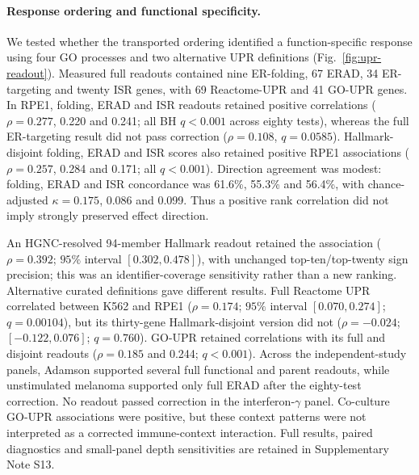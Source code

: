 \documentclass[a4paper,fleqn]{cas-sc}
\makeatletter
\DeclareRobustCommand{\rev}[1]{{\color{red}\def\@citecolor{black}\def\@linkcolor{red}\def\@urlcolor{red}#1}}
\makeatother
\begin{document}
\paragraph{\rev{Response ordering and functional specificity.}}

\rev{We tested whether the transported ordering identified a function-specific response using four GO processes and two alternative UPR definitions (Fig.~\ref{fig:upr-readout}).} \rev{Measured full readouts contained nine ER-folding, 67 ERAD, 34 ER-targeting and twenty ISR genes, with 69 Reactome-UPR and 41 GO-UPR genes.} \rev{In RPE1, folding, ERAD and ISR readouts retained positive correlations ($\rho=0.277$, 0.220 and 0.241; all BH $q<0.001$ across eighty tests), whereas the full ER-targeting result did not pass correction ($\rho=0.108$, $q=0.0585$).} \rev{Hallmark-disjoint folding, ERAD and ISR scores also retained positive RPE1 associations ($\rho=0.257$, 0.284 and 0.171; all $q<0.001$).} \rev{Direction agreement was modest: folding, ERAD and ISR concordance was 61.6\%, 55.3\% and 56.4\%, with chance-adjusted $\kappa=0.175$, 0.086 and 0.099.} \rev{Thus a positive rank correlation did not imply strongly preserved effect direction.}

\rev{An HGNC-resolved 94-member Hallmark readout retained the association ($\rho=0.392$; $95\%$ interval $[0.302,0.478]$), with unchanged top-ten/top-twenty sign precision; this was an identifier-coverage sensitivity rather than a new ranking.} \rev{Alternative curated definitions gave different results.} \rev{Full Reactome UPR correlated between K562 and RPE1 ($\rho=0.174$; $95\%$ interval $[0.070,0.274]$; $q=0.00104$), but its thirty-gene Hallmark-disjoint version did not ($\rho=-0.024$; $[-0.122,0.076]$; $q=0.760$).} \rev{GO-UPR retained correlations with its full and disjoint readouts ($\rho=0.185$ and 0.244; $q<0.001$).} \rev{Across the independent-study panels, Adamson supported several full functional and parent readouts, while unstimulated melanoma supported only full ERAD after the eighty-test correction.} \rev{No readout passed correction in the interferon-$\gamma$ panel.} \rev{Co-culture GO-UPR associations were positive, but these context patterns were not interpreted as a corrected immune-context interaction.} \rev{Full results, paired diagnostics and small-panel depth sensitivities are retained in Supplementary Note S13.}
\end{document}

